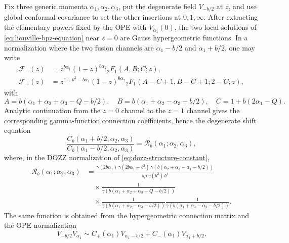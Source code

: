 \begin{proposition}
\label{prop:liouville-degenerate-hypergeometric-solutions}
Fix three generic momenta \(\alpha_1,\alpha_2,\alpha_3\), put the degenerate
field \(V_{-b/2}\) at \(z\), and use global conformal covariance to set the
other insertions at \(0,1,\infty\).  After extracting the elementary powers
fixed by the OPE with \(V_{\alpha_1}(0)\), the two local solutions of
\eqref{eq:liouville-bpz-equation} near \(z=0\) are Gauss hypergeometric
functions.  In a normalization where the two fusion channels are
\(\alpha_1-b/2\) and \(\alpha_1+b/2\), one may write
\begin{align}
  \mathcal F_-(z)
  &=
  z^{b\alpha_1}(1-z)^{b\alpha_2}
  {}_2F_1(A,B;C;z),\\
  \mathcal F_+(z)
  &=
  z^{1+b^2-b\alpha_1}(1-z)^{b\alpha_2}
  {}_2F_1(A-C+1,B-C+1;2-C;z),
\end{align}
with
\[
  A=b(\alpha_1+\alpha_2+\alpha_3-Q-b/2),\quad
  B=b(\alpha_1+\alpha_2-\alpha_3-b/2),\quad
  C=1+b(2\alpha_1-Q).
\]
Analytic continuation from the \(z=0\) channel to the \(z=1\) channel gives
the corresponding gamma-function connection coefficients, hence the
degenerate shift equation
\begin{equation}
  \frac{
    C_b(\alpha_1+b/2,\alpha_2,\alpha_3)
  }{
    C_b(\alpha_1-b/2,\alpha_2,\alpha_3)
  }
  =
  \mathcal R_b(\alpha_1;\alpha_2,\alpha_3),
  \label{eq:liouville-degenerate-shift-ratio}
\end{equation}
where, in the DOZZ normalization of \eqref{eq:dozz-structure-constant},
\begin{equation}
\begin{aligned}
  \mathcal R_b(\alpha_1;\alpha_2,\alpha_3)
  &=
  \frac{
    \gamma(2b\alpha_1)\,
    \gamma(2b\alpha_1-b^2)\,
    \gamma\!\left(b(\alpha_2+\alpha_3-\alpha_1-b/2)\right)
  }{
    \pi\mu\,\gamma(b^2)\,b^4
  }
  \\
  &\quad\times
  \frac1{\gamma\!\left(b(\alpha_1+\alpha_2+\alpha_3-Q-b/2)\right)}
  \\
  &\quad\times
  \frac1{\gamma\!\left(b(\alpha_1+\alpha_2-\alpha_3-b/2)\right)}
  \frac1{\gamma\!\left(b(\alpha_1+\alpha_3-\alpha_2-b/2)\right)} .
\end{aligned}
  \label{eq:liouville-dozz-b-shift-ratio}
\end{equation}
The same function is obtained from the hypergeometric connection matrix and
the OPE normalization
\[
  V_{-b/2}V_{\alpha_1}
  \sim
  C_+(\alpha_1)V_{\alpha_1-b/2}
  +C_-(\alpha_1)V_{\alpha_1+b/2}.
\]
\end{proposition}

